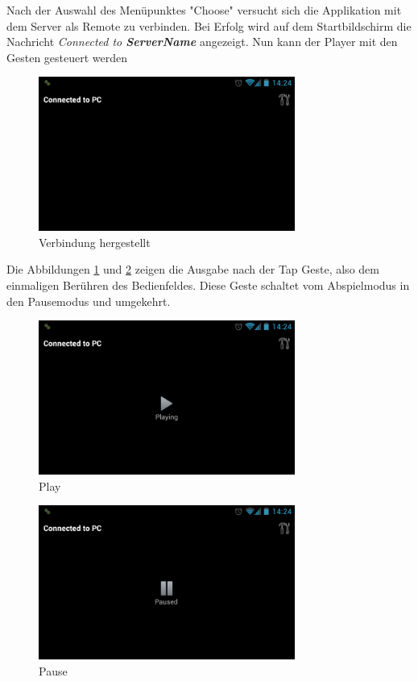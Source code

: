 \documentclass[a4paper,12pt]{article}
\begin{document}
Nach der Auswahl des Menüpunktes "Choose" versucht sich die Applikation mit dem Server als Remote zu verbinden. Bei Erfolg wird auf dem Startbildschirm die Nachricht \textit{Connected to \textbf{ServerName}} angezeigt. Nun kann der Player mit den Gesten gesteuert werden
\begin{figure}[H]
\centering
\includegraphics[width=0.75\textwidth]{Screenshot_6.png}
\caption{Verbindung hergestellt}
\end{figure}
Die Abbildungen \ref{fig:play} und \ref{fig:pause} zeigen die Ausgabe nach der Tap Geste, also dem einmaligen Berühren des Bedienfeldes. Diese Geste schaltet vom Abspielmodus in den Pausemodus und umgekehrt.  
\begin{figure}[H]
\centering
\includegraphics[width=0.75\textwidth]{Screenshot_7.png}
\caption{Play}
\label{fig:play}
\end{figure}
\begin{figure}[H]
\centering
\includegraphics[width=0.75\textwidth]{Screenshot_8.png}
\caption{Pause}
\label{fig:pause}
\end{figure}
\end{document}
